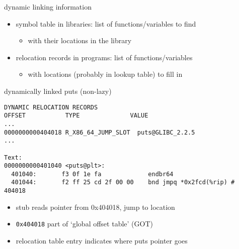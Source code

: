 \begin{frame}{dynamic linking information}
\begin{itemize}
\item symbol table in libraries: list of functions/variables to find
    \begin{itemize}
    \item with their locations in the library
    \end{itemize}
\item relocation records in programs: list of functions/variables
    \begin{itemize}
    \item with locations (probably in lookup table) to fill in
    \end{itemize}
\end{itemize}
\end{frame}


\begin{frame}[fragile,label=dynamicPuts]{dynamically linked puts (non-lazy)}
\begin{Verbatim}[commandchars=Q\{\},fontsize=\fontsize{9}{10}\selectfont]
DYNAMIC RELOCATION RECORDS
OFFSET           TYPE              VALUE 
...
0000000000404018 R_X86_64_JUMP_SLOT  puts@GLIBC_2.2.5
...

Text:
0000000000401040 <puts@plt>:
  401040:       f3 0f 1e fa             endbr64 
  401044:       f2 ff 25 cd 2f 00 00    bnd jmpq *0x2fcd(%rip) # 404018
\end{Verbatim}
\begin{itemize}
    \item stub reads pointer from 0x404018, jump to location
    \item {\tt 0x404018} part of `global offset table' (GOT)
    \item relocation table entry indicates where puts pointer goes
\end{itemize}
\end{frame}


